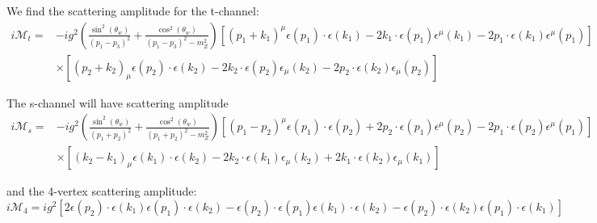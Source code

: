 \documentclass[11pt]{article}
\begin{document}
{We find the scattering amplitude for the t-channel:
\begin{equation}
    \begin{aligned}
i \mathcal{M}_{t}=&-i g^{2}\left(\frac{\sin^{2}(\theta_w)}{\left(p_{1}-p_{3}\right)^{2}}+\frac{\cos^{2}(\theta_w)}{\left(p_{1}-p_{3}\right)^{2}-m_{Z}^{2}}\right)\left[\left(p_{1}+k_{1}\right)^{\mu} \epsilon\left(p_{1}\right) \cdot \epsilon\left(k_{1}\right)-2 k_{1} \cdot \epsilon\left(p_{1}\right) \epsilon^{\mu}\left(k_{1}\right)-2 p_{1} \cdot \epsilon\left(k_{1}\right) \epsilon^{\mu}\left(p_{1}\right)\right] \\
& \times\left[\left(p_{2}+k_{2}\right)_{\mu} \epsilon\left(p_{2}\right) \cdot \epsilon\left(k_{2}\right)-2 k_{2} \cdot \epsilon\left(p_{2}\right) \epsilon_{\mu}\left(k_{2}\right)-2 p_{2} \cdot \epsilon\left(k_{2}\right) \epsilon_{\mu}\left(p_{2}\right)\right]
\end{aligned}
\end{equation}

The s-channel will have scattering amplitude
\begin{equation}
    \begin{aligned}
i \mathcal{M}_{s}=&-i g^{2}\left(\frac{\sin^{2}(\theta_w)}{\left(p_{1}+p_{2}\right)^{2}}+\frac{\cos^{2}(\theta_w)}{\left(p_{1}+p_{2}\right)^{2}-m_{Z}^{2}}\right)\left[\left(p_{1}-p_{2}\right)^{\mu} \epsilon\left(p_{1}\right) \cdot \epsilon\left(p_{2}\right)+2 p_{2} \cdot \epsilon\left(p_{1}\right) \epsilon^{\mu}\left(p_{2}\right)-2 p_{1} \cdot \epsilon\left(p_{2}\right) \epsilon^{\mu}\left(p_{1}\right)\right] \\
& \times\left[\left(k_{2}-k_{1}\right)_{\mu} \epsilon\left(k_{1}\right) \cdot \epsilon\left(k_{2}\right)-2 k_{2} \cdot \epsilon\left(k_{1}\right) \epsilon_{\mu}\left(k_{2}\right)+2 k_{1} \cdot \epsilon\left(k_{2}\right) \epsilon_{\mu}\left(k_{1}\right)\right]
\end{aligned}
\end{equation}

and the 4-vertex scattering amplitude:
\begin{equation}
    i \mathcal{M}_{4}=i g^{2}\left[2 \epsilon\left(p_{2}\right) \cdot \epsilon\left(k_{1}\right) \epsilon\left(p_{1}\right) \cdot \epsilon\left(k_{2}\right)-\epsilon\left(p_{2}\right) \cdot \epsilon\left(p_{1}\right) \epsilon\left(k_{1}\right) \cdot \epsilon\left(k_{2}\right)-\epsilon\left(p_{2}\right) \cdot \epsilon\left(k_{2}\right) \epsilon\left(p_{1}\right) \cdot \epsilon\left(k_{1}\right)\right]
\end{equation}

}
\end{document}
